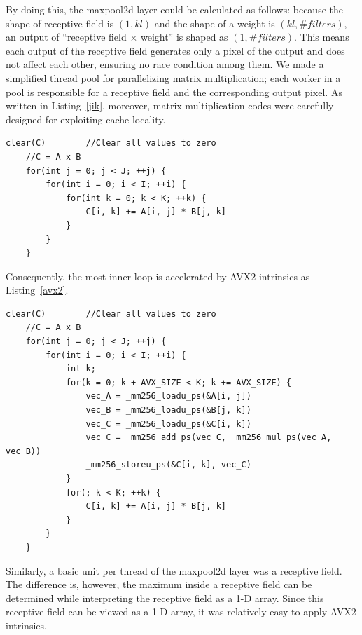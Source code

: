 \documentclass[a4paper,12pt]{article}
\begin{document}
By doing this, the maxpool2d layer could be calculated as follows: because the shape of receptive field is $(1, \textit{kl})$ and the shape of a weight is $(\textit{kl}, \textit{\#filters})$, an output of ``receptive field $\times$ weight'' is shaped as $(1, \textit{\#filters})$. This means each output of the receptive field generates only a pixel of the output and does not affect each other, ensuring no race condition among them. We made a simplified thread pool for parallelizing matrix multiplication; each worker in a pool is responsible for a receptive field and the corresponding output pixel. As written in Listing~\ref{jik}, moreover, matrix multiplication codes were carefully designed for exploiting cache locality. 
\begin{lstlisting}[gobble=4, label={jik}, captionpos=b, caption={A cache-friendly matrix multiplication pseudo-code. Unlike normally used codes (I, J, K ordered loop), this code minimized horizontal traversal to fully exploit cache prefetchers and cache locality. Note that the shapes of A, B, and C are (I x J), (J x K), and (I x K).}]
	clear(C)		//Clear all values to zero
	//C = A x B
	for(int j = 0; j < J; ++j) {
		for(int i = 0; i < I; ++i) {
			for(int k = 0; k < K; ++k) {
				C[i, k] += A[i, j] * B[j, k]
			}
		}
	}
\end{lstlisting}
Consequently, the most inner loop is accelerated by AVX2 intrinsics as Listing~\ref{avx2}.

\begin{lstlisting}[gobble=4, label={avx2}, captionpos=b, caption={A revised matrix multiplication pseudo-code with AVX2. In the first loop of $k$, $\textit{AVX\_SIZE}$ elements are calcuated at once if elements are sufficient. In the second loop, the remaining elements are calcuated. Note that $\textit{AVX\_SIZE}$ is 8 since 32-bit floating points were used and AVX2 can hold 256-bit values at once.}]
	clear(C)		//Clear all values to zero
	//C = A x B
	for(int j = 0; j < J; ++j) {
		for(int i = 0; i < I; ++i) {
			int k;
			for(k = 0; k + AVX_SIZE < K; k += AVX_SIZE) {
				vec_A = _mm256_loadu_ps(&A[i, j])
				vec_B = _mm256_loadu_ps(&B[j, k])
				vec_C = _mm256_loadu_ps(&C[i, k])
				vec_C = _mm256_add_ps(vec_C, _mm256_mul_ps(vec_A, vec_B))
				_mm256_storeu_ps(&C[i, k], vec_C)
			}
			for(; k < K; ++k) {
				C[i, k] += A[i, j] * B[j, k]
			}
		}
	}
\end{lstlisting}
Similarly, a basic unit per thread of the maxpool2d layer was a receptive field. The difference is, however, the maximum inside a receptive field can be determined while interpreting the receptive field as a 1-D array. Since this receptive field can be viewed as a 1-D array, it was relatively easy to apply AVX2 intrinsics.
\end{document}
